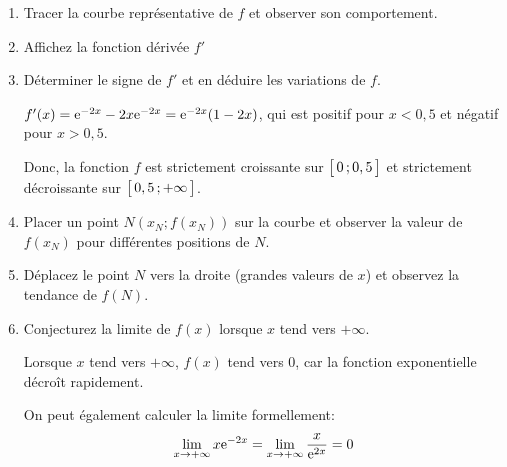 \documentclass[11pt, a4paper]{report}
\begin{document}
\begin{enumerate}[resume]
    \item Tracer la courbe représentative de $f$ et observer son comportement. 
    \item Affichez la fonction dérivée $f'$  
    \item Déterminer le signe de $f'$ et en déduire les variations de $f$. 
     \begin{blocvisible}[height=4.5]
        \begin{minipage}{0.55\linewidth}
            $f'(x) = \mathrm{e}^{-2x} - 2x \mathrm{e}^{-2x} = \mathrm{e}^{-2x}(1 - 2x)$, qui est positif pour $x < 0,5$ et négatif pour $x > 0,5$.

        Donc, la fonction $f$ est strictement croissante sur $\bigl[ \, 0 \, ; 0,5 \,\bigl]$ et strictement décroissante sur $\bigl[ \, 0,5 \, ; +\infty \,\bigl]$.
        \end{minipage}\hfill
        \begin{minipage}{0.44\linewidth}
            
        \end{minipage}
    \end{blocvisible}
    \item Placer un point $N\left(x_N; f(x_N)\right)$ sur la courbe et observer la valeur de $f(x_N)$ pour différentes positions de $N$.        
    \item Déplacez le point $N$ vers la droite (grandes valeurs de $x$) et observez la tendance de $f(N)$. 
    \item Conjecturez la limite de $f(x)$ lorsque $x$ tend vers $+\infty$.  
    
    \begin{blocvisible}[height=3]
        Lorsque $x$ tend vers $+\infty$, $f(x)$ tend vers 0, car la fonction exponentielle décroît rapidement.

        On peut également calculer la limite formellement:
        \[\lim_{x \to +\infty} x \mathrm{e}^{-2x} = \lim_{x \to +\infty} \frac{x}{\mathrm{e}^{2x}}=  0\]
    \end{blocvisible}
\end{enumerate}

\bigskip
\end{document}
